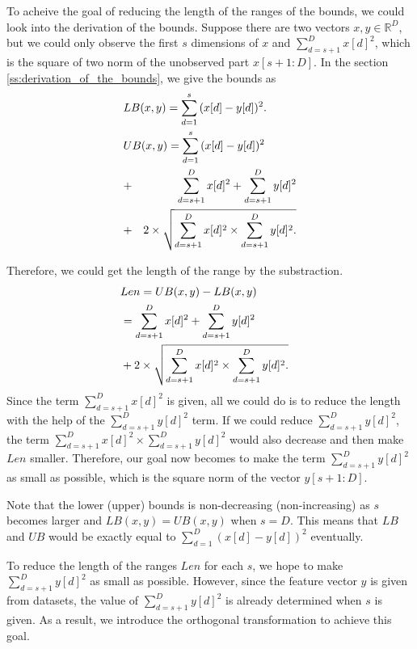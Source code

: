 To acheive the goal of reducing the length of the ranges of the bounds, we could look into the derivation of the bounds. Suppose there are two vectors $x,y\in \mathbb{R}^D$, but we could only observe the first $s$ dimensions of $x$ and $\sum^D_{d=s+1}{x[d]^2}$, which is the square of two norm of the unobserved part $x[s+1:D]$.  In the section \ref{ss:derivation_of_the_bounds}, we give the bounds as 
{
\begin{eqnarray*}
\lefteqn{LB(x,y) = \sum^s_{d=1}{(x[d]-y[d])^2}.} \label{eq:single-LB-tmp} \\
\lefteqn{UB(x,y) = \sum^s_{d=1}{(x[d]-y[d])^2}} \notag \\
& + & \sum^D_{d=s+1}{x[d]^2}+\sum^D_{d=s+1}{y[d]^2} \notag \\
& + & 2 \times \sqrt{\sum^D_{d=s+1}{x[d]^2}\times \sum^D_{d=s+1}{y[d]^2}.}\label{eq:single-UB-tmp}
\end{eqnarray*}
}

Therefore, we could get the length of the range by the substraction.
{
\begin{eqnarray*}
\lefteqn{Len = UB(x,y) - LB(x,y)}\\
& = \sum^D_{d=s+1}{x[d]^2}+\sum^D_{d=s+1}{y[d]^2} \\
& + 2 \times \sqrt{\sum^D_{d=s+1}{x[d]^2}\times \sum^D_{d=s+1}{y[d]^2}.}\label{eq:len-range}
\end{eqnarray*}
}
Since the term $\sum^D_{d=s+1}{x[d]^2}$ is given, all we could do is to reduce the length with the help of the $\sum^D_{d=s+1}{y[d]^2}$ term.  If we could reduce $\sum^D_{d=s+1}{y[d]^2}$, the term $\sum^D_{d=s+1}{x[d]^2}\times \sum^D_{d=s+1}{y[d]^2}$ would also decrease and then make $Len$ smaller.  Therefore, our goal now becomes to make the term $\sum^D_{d=s+1}{y[d]^2}$ as small as possible, which is the square norm of the vector $y[s+1:D]$.

Note that the lower (upper) bounds is non-decreasing (non-increasing) as $s$ becomes larger and $LB(x,y)=UB(x,y)$ when $s=D$.  This means that $LB$ and $UB$ would be exactly equal to $\sum^D_{d=1}{(x[d]-y[d])^2}$ eventually.

To reduce the length of the ranges $Len$ for each $s$, we hope to make $\sum^D_{d=s+1}{y[d]^2}$ as small as possible.  However, since the feature vector $y$ is given from datasets, the value of $\sum^D_{d=s+1}{y[d]^2}$ is already  determined when $s$ is given.  As a result, we introduce the orthogonal transformation to achieve this goal.



